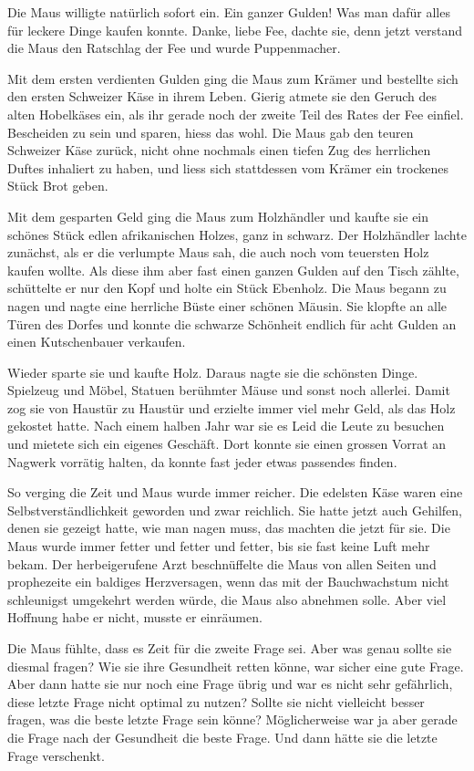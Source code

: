 Die Maus willigte natürlich sofort ein. Ein ganzer Gulden! Was man dafür alles für leckere Dinge kaufen konnte. Danke, liebe Fee, dachte sie, denn jetzt verstand die Maus den Ratschlag der Fee und wurde Puppenmacher. 

Mit dem ersten verdienten Gulden ging die Maus zum Krämer und bestellte sich den ersten Schweizer Käse in ihrem Leben. Gierig atmete sie den Geruch des alten Hobelkäses ein, als ihr gerade noch der zweite Teil des Rates der Fee einfiel. Bescheiden zu sein und sparen, hiess das wohl. Die Maus gab den teuren Schweizer Käse zurück, nicht ohne nochmals einen tiefen Zug des herrlichen Duftes inhaliert zu haben, und liess sich stattdessen vom Krämer ein trockenes Stück Brot geben. 

Mit dem gesparten Geld ging die Maus zum Holzhändler und kaufte sie ein schönes Stück edlen afrikanischen Holzes, ganz in schwarz. Der Holzhändler lachte zunächst, als er die verlumpte Maus sah, die auch noch vom teuersten Holz kaufen wollte. Als diese ihm aber fast einen ganzen Gulden auf den Tisch zählte, schüttelte er nur den Kopf und holte ein Stück Ebenholz. Die Maus begann zu nagen und nagte eine herrliche Büste einer schönen Mäusin. Sie klopfte an alle Türen des Dorfes und konnte die schwarze Schönheit endlich für acht Gulden an einen Kutschenbauer verkaufen.

Wieder sparte sie und kaufte Holz. Daraus nagte sie die schönsten Dinge. Spielzeug und Möbel, Statuen berühmter Mäuse und sonst noch allerlei. Damit zog sie von Haustür zu Haustür und erzielte immer viel mehr Geld, als das Holz gekostet hatte. Nach einem halben Jahr war sie es Leid die Leute zu besuchen und mietete sich ein eigenes Geschäft. Dort konnte sie einen grossen Vorrat an Nagwerk vorrätig halten, da konnte fast jeder etwas passendes finden.

So verging die Zeit und Maus wurde immer reicher. Die edelsten Käse waren eine Selbstverständlichkeit geworden und zwar reichlich. Sie hatte jetzt auch Gehilfen, denen sie gezeigt hatte, wie man nagen muss, das machten die jetzt für sie. Die Maus wurde immer fetter und fetter und fetter, bis sie fast keine Luft mehr bekam. Der herbeigerufene Arzt beschnüffelte die Maus von allen Seiten und prophezeite ein baldiges Herzversagen, wenn das mit der Bauchwachstum nicht schleunigst umgekehrt werden würde, die Maus also abnehmen solle. Aber viel Hoffnung habe er nicht, musste er einräumen.

Die Maus fühlte, dass es Zeit für die zweite Frage sei. Aber was genau sollte sie diesmal fragen? Wie sie ihre Gesundheit retten könne, war sicher eine gute Frage. Aber dann hatte sie nur noch eine Frage übrig und war es nicht sehr gefährlich, diese letzte Frage nicht optimal zu nutzen? Sollte sie nicht vielleicht besser fragen, was die beste letzte Frage sein könne? Möglicherweise war ja aber gerade die Frage nach der Gesundheit die beste Frage. Und dann hätte sie die letzte Frage verschenkt.

